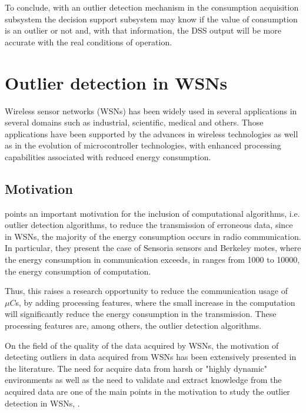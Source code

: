 To conclude, with an outlier detection mechanism in the consumption acquisition subsystem the decision support subsystem may know if the value of consumption is an outlier or not and, with that information, the DSS output will be more accurate with the real conditions of operation.

\newpage
\section{Outlier detection in WSNs}
\label{sec:od_wsn}
Wireless sensor networks (WSNs) has been widely used in several applications in several domains such as industrial, scientific, medical and others. Those applications have been supported by the advances in wireless technologies as well as in the evolution of microcontroller technologies, with enhanced processing capabilities associated with reduced energy consumption.

\subsection{Motivation}

\cite{class:rajasegarar:2007} points an important motivation for the inclusion of computational algorithms, i.e. outlier detection algorithms, to reduce the transmission of erroneous data, since in WSNs, the majority of the energy consumption occurs in radio communication. In particular, they present the case of Sensoria sensors and Berkeley motes, where the energy consumption in communication exceeds, in ranges from 1000 to 10000, the energy consumption of computation.

Thus, this raises a research opportunity to reduce the communication usage of $\mu C$s, by adding processing features, where the small increase in the computation will significantly reduce the energy consumption in the transmission. These processing features are, among others, the outlier detection algorithms.


On the field of the quality of the data acquired by WSNs, the motivation of detecting outliers in data acquired from WSNs has been extensively presented in the literature. The need for acquire data from harsh or "highly dynamic" environments as well as the need to validate and extract knowledge from the acquired data are one of the main points in the motivation to study the outlier detection in WSNs,  \cite{gen:zhang:2010,gen:chandola:2009,stat:ghorbel:2015,class:martins:2015b}.



